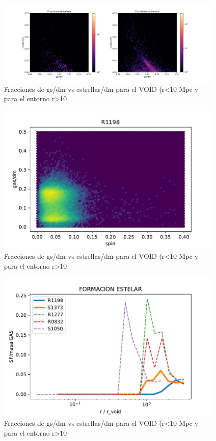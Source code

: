 \begin{figure}[h]
\centering
\includegraphics[width=18cm]{Figures/S1373_fraccionesdebarions.pdf}
\decoRule
\caption[Fraccione stellar vs gas]{Fracciones de gs/dm vs estrellas/dm para el VOID (r<10 Mpc y para el entorno r>10}
\label{fig:Electron}
\end{figure}

\begin{figure}[h]
\centering
\includegraphics[width=18cm]{Figures/R1198_frac-spin.pdf}
\decoRule
\caption[Fraccione stellar vs gas]{Fracciones de gs/dm vs estrellas/dm para el VOID (r<10 Mpc y para el entorno r>10}
\label{fig:Electron}
\end{figure}

\begin{figure}[h]
\centering
\includegraphics[width=18cm]{Figures/SF.pdf}
\decoRule
\caption[Fraccione stellar vs gas]{Fracciones de gs/dm vs estrellas/dm para el VOID (r<10 Mpc y para el entorno r>10}
\label{fig:Electron}
\end{figure}

